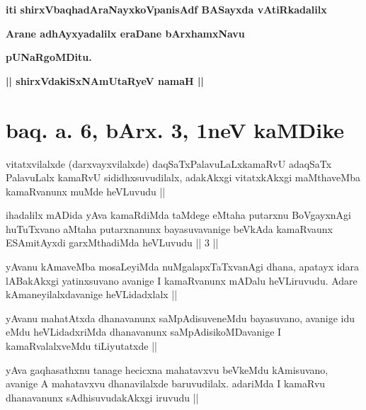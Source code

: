 
\begin{center}
{\bf iti shirxVbaqhadAraNayxkoVpanisAdf BASayxda vAtiRkadalilx}
\smallskip

{\bf Arane adhAyxyadalilx eraDane bArxhamxNavu}
\smallskip

{\bf pUNaRgoMDitu.}

\smallskip
{\bf || shirxVdakiSxNAmUtaRyeV namaH ||}
\end{center}

\section*{baq. a. 6, bArx. 3, 1neV kaMDike}


\begin{artha}
vitatxvilalxde (darxvayxvilalxde) daqSaTxPalavuLaLxkamaRvU adaqSaTx PalavuLalx kamaRvU sididhxsuvudilalx, adakAkxgi vitatxkAkxgi maMthaveMba kamaRvanunx muMde heVLuvudu ||
\end{artha}


\begin{artha}
ihadalilx mADida yAva kamaRdiMda taMdege eMtaha putarxnu BoVgayxnAgi huTuTxvano aMtaha putarxnanunx bayasuvavanige beVkAda kamaRvaunx ESAmitAyxdi garxMthadiMda heVLuvudu || 3 ||
\end{artha}


\begin{artha}
yAvanu kAmaveMba mosaLeyiMda nuMgalapxTaTxvanAgi dhana, apatayx idara lABakAkxgi yatinxsuvano avanige I kamaRvanunx mADalu heVLiruvudu. Adare kAmaneyilalxdavanige heVLidadxlalx ||
\end{artha}


\begin{artha}
yAvanu mahatAtxda dhanavanunx saMpAdisuveneMdu bayasuvano, avanige idu eMdu heVLidadxriMda dhanavanunx saMpAdisikoMDavanige I kamaRvalalxveMdu tiLiyutatxde ||
\end{artha}


\begin{artha}
yAva gaqhasathxnu tanage hecicxna mahatavxvu beVkeMdu kAmisuvano, avanige A mahatavxvu dhanavilalxde baruvudilalx. adariMda I kamaRvu dhanavanunx sAdhisuvudakAkxgi iruvudu ||
\end{artha}

